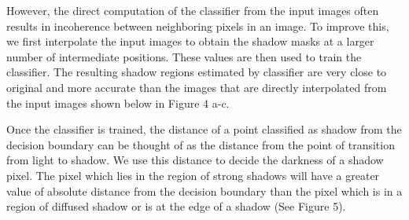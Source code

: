 However, the direct computation of the classifier from the input images often
results in incoherence between neighboring pixels in an image. To improve this,
we first interpolate the input images to obtain the shadow masks at a larger
number of intermediate positions. These values are then used to train the
classifier. The resulting shadow regions estimated by classifier are very close
to original and more accurate than the images that are directly interpolated
from the input images shown below in Figure 4 a-c.





Once the classifier is trained, the distance of a point classified as shadow
from the decision boundary can be thought of as the distance from the point of
transition from light to shadow. We use this distance to decide the darkness of
a shadow pixel. The pixel which lies in the region of strong shadows will have a
greater value of absolute distance from the decision boundary than the pixel
which is in a region of diffused shadow or is at the edge of a shadow (See
Figure 5).

